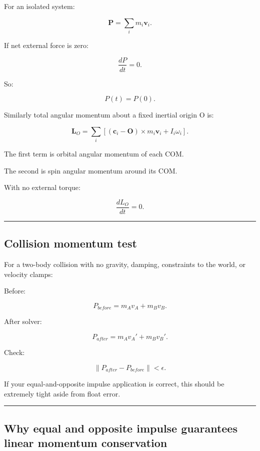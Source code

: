 \hypertarget{06-engine-ii-ch039-part-1692-momentum-conservation-checks}{}

For an isolated system:

\[
\boxed{
\mathbf P
=
\sum_i
m_i\mathbf v_i.
}
\]

If net external force is zero:

\[
\frac{dP}{dt}=0.
\]

So:

\[
P(t)=P(0).
\]

Similarly total angular momentum about a fixed inertial origin O is:

\[
\boxed{
\mathbf L_O
=
\sum_i
[
(\mathbf c_i-\mathbf O)\times m_i\mathbf v_i
+
I_i\omega_i
].
}
\]

The first term is orbital angular momentum of each COM.

The second is spin angular momentum around its COM.

With no external torque:

\[
\frac{dL_O}{dt}=0.
\]

\begin{center}\rule{0.5\linewidth}{0.5pt}\end{center}

\subsection{Collision momentum test}\label{06-engine-ii-ch039-collision-momentum-test}

\hypertarget{06-engine-ii-ch039-collision-momentum-test}{}

For a two-body collision with no gravity, damping, constraints to the world, or velocity clamps:

Before:

\[
P_{before}
=
m_Av_A+
m_Bv_B.
\]

After solver:

\[
P_{after}
=
m_Av_A'+
m_Bv_B'.
\]

Check:

\[
\boxed{
\|P_{after}-P_{before}\|
<
\epsilon.
}
\]

If your equal-and-opposite impulse application is correct, this should be extremely tight aside from float error.

\begin{center}\rule{0.5\linewidth}{0.5pt}\end{center}

\subsection{Why equal and opposite impulse guarantees linear momentum conservation}\label{06-engine-ii-ch039-why-equal-and-opposite-impulse-guarantees-linear-momentum-conservation}

